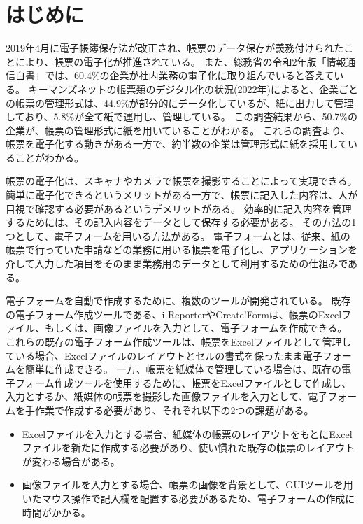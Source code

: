\chapter{はじめに}\label{cha:Introduction}
2019年4月に電子帳簿保存法が改正され、帳票のデータ保存が義務付けられたことにより、帳票の電子化が推進されている\cite{電子帳簿保存法}。
また、総務省の令和2年版「情報通信白書」では、60.4\%の企業が社内業務の電子化に取り組んでいると答えている\cite{デジタルデータの経済的価値の計測と活用の現状に関する調査研究}。
キーマンズネットの帳票類のデジタル化の状況(2022年)によると、企業ごとの帳票の管理形式は、44.9\%が部分的にデータ化しているが、紙に出力して管理しており、5.8\%が全て紙で運用し、管理している\cite{帳票類のデジタル化の状況}。
この調査結果から、50.7\%の企業が、帳票の管理形式に紙を用いていることがわかる。
これらの調査より、帳票を電子化する動きがある一方で、約半数の企業は管理形式に紙を採用していることがわかる。

帳票の電子化は、スキャナやカメラで帳票を撮影することによって実現できる。
簡単に電子化できるというメリットがある一方で、帳票に記入した内容は、人が目視で確認する必要があるというデメリットがある。
効率的に記入内容を管理するためには、その記入内容をデータとして保存する必要がある。
その方法の1つとして、電子フォームを用いる方法がある。
電子フォームとは、従来、紙の帳票で行っていた申請などの業務に用いる帳票を電子化し、アプリケーションを介して入力した項目をそのまま業務用のデータとして利用するための仕組みである\cite{電子フォーム}。

電子フォームを自動で作成するために、複数のツールが開発されている。
既存の電子フォーム作成ツールである、i-Reporter\cite{i-Reporter}やCreate!Form\cite{Create!Form}は、帳票のExcelファイル、もしくは、画像ファイルを入力として、電子フォームを作成できる。
これらの既存の電子フォーム作成ツールは、帳票をExcelファイルとして管理している場合、Excelファイルのレイアウトとセルの書式を保ったまま電子フォームを簡単に作成できる。
一方、帳票を紙媒体で管理している場合は、既存の電子フォーム作成ツールを使用するために、帳票をExcelファイルとして作成し、入力とするか、紙媒体の帳票を撮影した画像ファイルを入力として、電子フォームを手作業で作成する必要があり、それぞれ以下の2つの課題がある。

\begin{itemize}
  \item Excelファイルを入力とする場合、紙媒体の帳票のレイアウトをもとにExcelファイルを新たに作成する必要があり、使い慣れた既存の帳票のレイアウトが変わる場合がある。
  \item 画像ファイルを入力とする場合、帳票の画像を背景として、GUIツールを用いたマウス操作で記入欄を配置する必要があるため、電子フォームの作成に時間がかかる。
\end{itemize}

